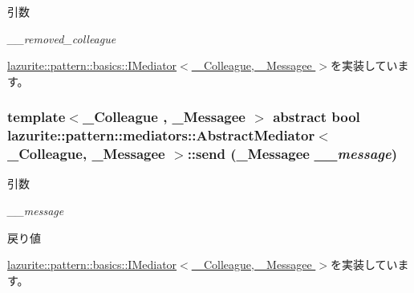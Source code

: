 \begin{DoxyParams}{引数}
\item[{\em \_\-\_\-removed\_\-colleague}]\end{DoxyParams}


\hyperlink{interfacelazurite_1_1pattern_1_1basics_1_1_i_mediator_3_01___colleague_00_01___messagee_01_4_ab594b14be1fa04f9445ad1737115cb80}{lazurite::pattern::basics::IMediator$<$ \_\-Colleague, \_\-Messagee $>$}を実装しています。\hypertarget{classlazurite_1_1pattern_1_1mediators_1_1_abstract_mediator_3_01___colleague_00_01___messagee_01_4_a06ede4a2f26fa304a000175ecad68c9c}{
\subsubsection[{send}]{\setlength{\rightskip}{0pt plus 5cm}template$<$\_\-Colleague , \_\-Messagee $>$ abstract bool lazurite::pattern::mediators::AbstractMediator$<$ \_\-Colleague, \_\-Messagee $>$::send (\_\-Messagee {\em \_\-\_\-message})}}
\label{classlazurite_1_1pattern_1_1mediators_1_1_abstract_mediator_3_01___colleague_00_01___messagee_01_4_a06ede4a2f26fa304a000175ecad68c9c}

\begin{DoxyParams}{引数}
\item[{\em \_\-\_\-message}]\end{DoxyParams}
\begin{DoxyReturn}{戻り値}

\end{DoxyReturn}


\hyperlink{interfacelazurite_1_1pattern_1_1basics_1_1_i_mediator_3_01___colleague_00_01___messagee_01_4_a82cd22f9cc946dcaa4be2a2cf87674b3}{lazurite::pattern::basics::IMediator$<$ \_\-Colleague, \_\-Messagee $>$}を実装しています。

